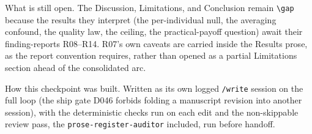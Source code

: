What is still open.
The Discussion, Limitations, and Conclusion remain \verb|\gap| because the results they interpret (the per-individual null, the averaging confound, the quality law, the ceiling, the practical-payoff question) await their finding-reports R08--R14.
R07's own caveats are carried inside the Results prose, as the report convention requires, rather than opened as a partial Limitations section ahead of the consolidated arc.

How this checkpoint was built.
Written as its own logged \texttt{/write} session on the full loop (the ship gate D046 forbids folding a manuscript revision into another session), with the deterministic checks run on each edit and the non-skippable review pass, the \texttt{prose-register-auditor} included, run before handoff.
